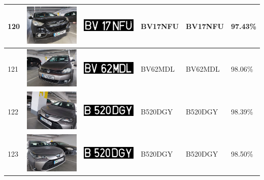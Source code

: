 \documentclass[a4paper,12pt]{report}
\begin{document}
\begin{longtable}{| m{0.6cm} | m{3cm} | m{3cm} | m{1.8cm} | m{1.8cm} | m{1.8cm} |}
    120 & \includegraphics[width=3cm,keepaspectratio]{dataset/70_s1.jpg}  & \includegraphics[width=3cm,keepaspectratio]{segmentari/120.jpg} & BV17NFU             & BV17NFU              & 97.43\%    \\ \hline
    121 & \includegraphics[width=3cm,keepaspectratio]{dataset/71_d1.jpg}  & \includegraphics[width=3cm,keepaspectratio]{segmentari/121.jpg} & BV62MDL             & BV62MDL              & 98.06\%    \\ \hline
    122 & \includegraphics[width=3cm,keepaspectratio]{dataset/72_d1.jpg}  & \includegraphics[width=3cm,keepaspectratio]{segmentari/122.jpg} & B520DGY             & B520DGY              & 98.39\%    \\ \hline
    123 & \includegraphics[width=3cm,keepaspectratio]{dataset/72_s1.jpg}  & \includegraphics[width=3cm,keepaspectratio]{segmentari/123.jpg} & B520DGY             & B520DGY              & 98.50\%    \\ \hline

\end{longtable}
\end{document}

